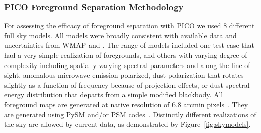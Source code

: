 \documentclass[PICOReport.tex]{subfiles}
\begin{document}


\subsubsection{PICO Foreground Separation Methodology}

For assessing the efficacy of foreground separation with PICO we used 8 different full sky models. All models were broadly consistent with available data and uncertainties from WMAP and \planck . The range of models included one test case that had a very simple realization of foregrounds, and others with varying degree of complexity including spatially varying spectral parameters and along the line of sight, anomalous microwave emission  polarized, dust polarization that rotates slightly as a function of frequency because of projection effects, or dust spectral energy distribution that departs from a simple modified blackbody. All foreground maps are generated at native resolution of 6.8 arcmin pixels~\citep{healpix}. They are generated using PySM and/or PSM codes~\citep{??}.   Distinctly different realizations of the sky are allowed by current data, as demonstrated by Figure~\ref{fig:skymodels}. 
\end{document}
